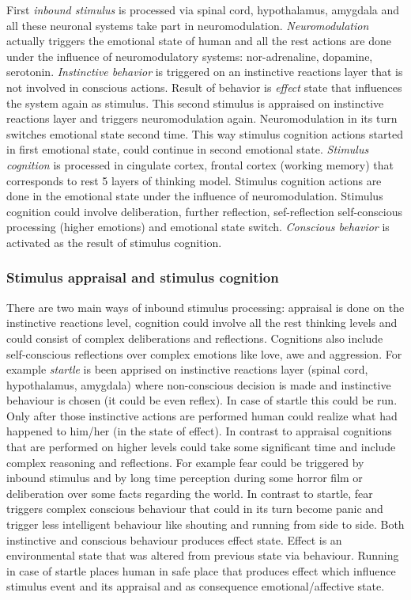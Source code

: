 First \emph{inbound stimulus} is processed via spinal cord, hypothalamus, amygdala and all these neuronal systems take part in neuromodulation. 
\emph{Neuromodulation} actually triggers the emotional state of human and all the rest actions are done under the influence of neuromodulatory systems: nor-adrenaline, dopamine, serotonin. 
\emph{Instinctive behavior} is triggered on an instinctive reactions layer that is not involved in conscious actions. 
Result of behavior is \emph{effect} state that influences the system again as stimulus. This second stimulus is appraised on instinctive reactions layer and triggers neuromodulation again. Neuromodulation in its turn switches emotional state second time. This way stimulus cognition actions started in first emotional state, could continue in second emotional state. 
\emph{Stimulus cognition} is processed in cingulate cortex, frontal cortex (working memory) that corresponds to rest 5 layers of thinking model. Stimulus cognition actions are done in the emotional state under the influence of neuromodulation. Stimulus cognition could involve deliberation, further reflection, sef-reflection self-conscious processing (higher emotions) and  emotional state switch.
\emph{Conscious behavior} is activated as the result of stimulus cognition.

\subsubsection{Stimulus appraisal and stimulus cognition}

There are two main ways of inbound stimulus processing: appraisal is done on the instinctive reactions level, cognition could involve all the rest thinking levels and could consist of complex deliberations and reflections.
Cognitions also include self-conscious reflections over complex emotions like love, awe and aggression. For example \emph{startle} is been apprised on instinctive reactions layer (spinal cord, hypothalamus, amygdala) where non-conscious decision is made and instinctive behaviour is chosen (it could be even reflex). In case of startle this could be run. Only after those instinctive actions are performed human could realize what had happened to him/her (in the state of effect). In contrast to appraisal cognitions that are performed on higher levels could take some significant time and include complex reasoning and reflections. For example fear could be triggered by inbound stimulus and by long time perception during some horror film or deliberation over some facts regarding the world. In contrast to startle, fear triggers complex conscious behaviour that could in its turn become panic and trigger less intelligent behaviour like shouting and running from side to side. Both instinctive and conscious behaviour produces effect state. Effect is an environmental state that was altered from previous state via behaviour. Running in case of startle places human in safe place that produces effect which influence stimulus event and its appraisal and as consequence emotional/affective state.

